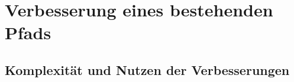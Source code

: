 \chapter{Verbesserung eines bestehenden Pfads}





\section{Komplexität und Nutzen der Verbesserungen}

